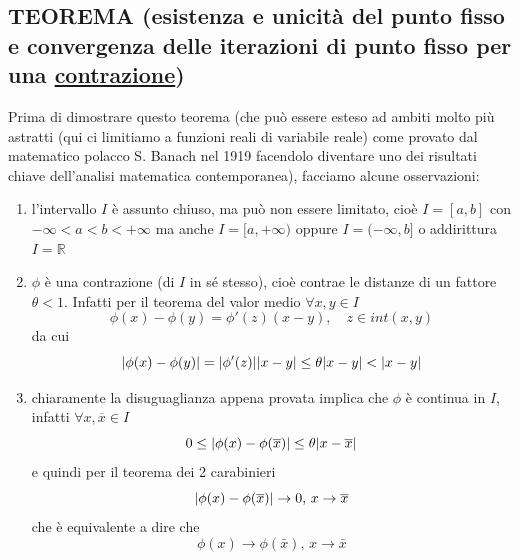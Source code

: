 \subsection{TEOREMA (esistenza e unicità del punto fisso e convergenza delle iterazioni di punto fisso per una \uline{contrazione})}
\begin{center}
\end{center}
Prima di dimostrare questo teorema (che può essere esteso ad ambiti molto più astratti (qui ci limitiamo a funzioni reali di variabile reale) come provato dal matematico polacco S. Banach nel 1919 facendolo diventare uno dei risultati chiave dell'analisi matematica contemporanea), facciamo alcune osservazioni:
\begin{enumerate}
    \item l'intervallo $I$ è assunto chiuso, ma può non essere limitato, cioè $I=[a,b]$ con $-\infty < a < b < +\infty$ ma anche $I=[a, +\infty)$ oppure $I = (-\infty,b]$ o addirittura $I=\mathbb{R}$
    \item $\phi$ è una contrazione (di $I$ in sé stesso), cioè contrae le distanze di un fattore $\theta < 1$. Infatti per il teorema del valor medio $\forall x,y \in I$
    \[ \phi(x)-\phi(y)=\phi'(z)(x-y), \quad z \in int(x,y) \]
    da cui
    \[ \lvert\phi(x)-\phi(y)\rvert=\lvert\phi'(z)\rvert\lvert x-y\rvert\leq\theta\lvert x-y\rvert<\lvert x-y\rvert\]
    \item chiaramente la disuguaglianza appena provata implica che $\phi$ è continua in $I$, infatti $\forall x,\overline{x}\in I$
    \[ 0 \leq \lvert\phi(x)-\phi(\overline{x})\rvert \leq \theta \lvert x-\overline{x}\rvert \]
    e quindi per il teorema dei 2 carabinieri
    \[ \lvert\phi(x)-\phi(\overline{x})\rvert \rightarrow 0, \, x \rightarrow \overline{x} \]
    che è equivalente a dire che
    \[ \phi(x) \rightarrow \phi(\bar{x}),\, x \rightarrow \bar{x} \]
\end{enumerate}
